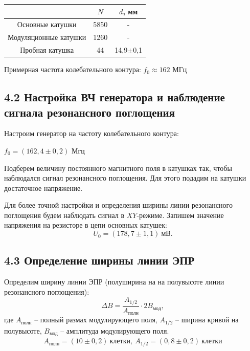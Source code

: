 \documentclass[a4paper,12pt]{report}
\begin{document}
\begin{table}[H]
\begin{tabular}{|c|c|c|}
\hline
                      & $N$    & $d$, мм     \\ \hline
Основные катушки      & 5850 & -         \\ \hline
Модуляционные катушки & 1260 & -         \\ \hline
Пробная катушка       & 44   & 14,9$\pm$0,1 \\ \hline
\end{tabular}
\end{table}

Примерная частота колебательного контура: $f_{0} \approx 162$ МГц



\subsection*{4.2 Настройка ВЧ генератора и наблюдение сигнала резонансного поглощения}

Настроим генератор на частоту колебательного контура:
\begin{center}
    $f_{0} = (162,4\pm 0,2)$ Мгц
\end{center}

Подберем величину постоянного магнитного поля в катушках так, чтобы наблюдался сигнал резонансного поглощения. Для этого подадим на катушки достаточное напряжение.
		
Для более точной настройки и определения ширины линии резонансного поглощения будем наблюдать сигнал в $XY$-режиме. Запишем значение напряжения на резисторе в цепи основных катушек:
		\begin{equation*}
			U_0 = (178,7 \pm 1,1) \ \text{мВ}.
		\end{equation*}
		
\subsection*{4.3 Определение ширины линии ЭПР}
Определим ширину линии ЭПР (полуширина на на полувысоте линии резонансного поглощения):
		\begin{equation*}
			\Delta B =  \frac{A_{1/2}}{A_{\text{полн}}}\cdot2 B_\text{мод},
		\end{equation*}
		где $A_\text{полн}$ -- полный размах модулирующего поля, $A_{1/2}$ -- ширина кривой на полувысоте, $B_\text{мод}$ -- амплитуда модулирующего поля.
		\begin{equation*}
			\begin{gathered}
				A_\text{полн} = (10 \pm 0,2 ) \ \text{клетки}, \ A_{1/2} = (0,8 \pm 0,2) \ \text{клетки}
			\end{gathered}
		\end{equation*}
\end{document}
